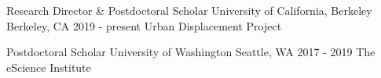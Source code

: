 

\begin{cventries}

  \cventry
    {Research Director \& Postdoctoral Scholar} %
    {University of California, Berkeley} %
    {Berkeley, CA} %
    {2019 - present} %
    {Urban Displacement Project}
    
  \cventry
    {Postdoctoral Scholar} %
    {University of Washington} %
    {Seattle, WA} %
    {2017 - 2019} %
    {The eScience Institute}
    
\end{cventries}
